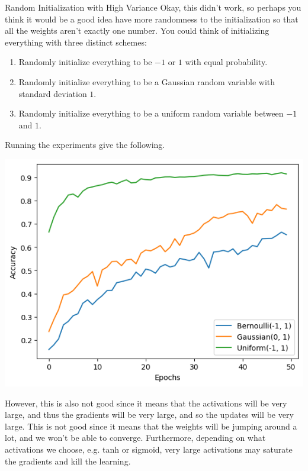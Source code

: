 \documentclass{article}
\begin{document}
    \begin{example}{Random Initialization with High Variance}
      Okay, this didn't work, so perhaps you think it would be a good idea have more randomness to the initialization so that all the weights aren't exactly one number. You could think of initializing everything with three distinct schemes: 
      \begin{enumerate}[itemsep=0mm] 
        \item Randomly initialize everything to be $-1$ or $1$ with equal probability. 
        \item Randomly initialize everything to be a Gaussian random variable with standard deviation $1$. 
        \item Randomly initialize everything to be a uniform random variable between $-1$ and $1$. 
      \end{enumerate}
      Running the experiments give the following. 
      \begin{center} 
        \includegraphics[scale=0.5]{img/01_MLP/second_initialization.png}
      \end{center}
      However, this is also not good since it means that the activations will be very large, and thus the gradients will be very large, and so the updates will be very large. This is not good since it means that the weights will be jumping around a lot, and we won't be able to converge. Furthermore, depending on what activations we choose, e.g. tanh or sigmoid, very large activations may saturate the gradients and kill the learning. 
    \end{example}
\end{document}
